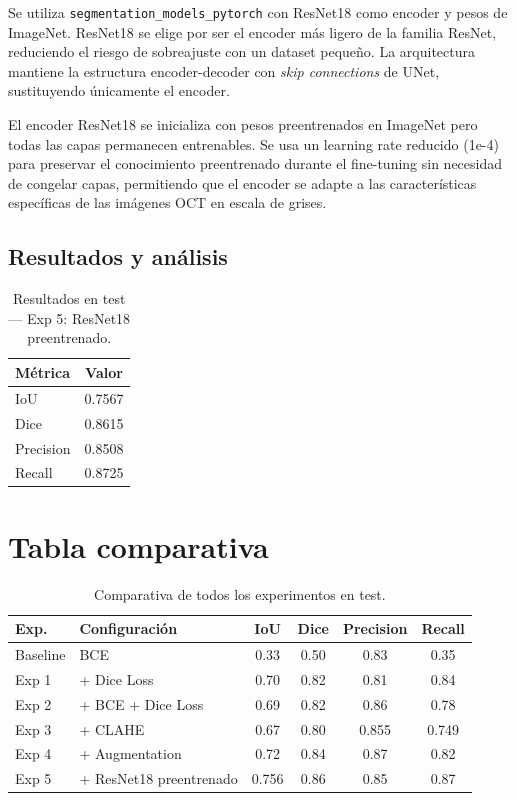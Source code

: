 \documentclass[12pt,a4paper]{article}
\begin{document}
Se utiliza \texttt{segmentation\_models\_pytorch} con ResNet18 como encoder y pesos de ImageNet. ResNet18 se elige por ser el encoder más ligero de la familia ResNet, reduciendo el riesgo de sobreajuste con un dataset pequeño. La arquitectura mantiene la estructura encoder-decoder con \textit{skip connections} de UNet, sustituyendo únicamente el encoder.

El encoder ResNet18 se inicializa con pesos preentrenados en ImageNet pero todas las capas permanecen entrenables. Se usa un learning rate reducido (1e-4) para preservar el conocimiento preentrenado durante el fine-tuning sin necesidad de congelar capas, permitiendo que el encoder se adapte a las características específicas de las imágenes OCT en escala de grises.

\subsection{Resultados y análisis}

\begin{table}[H]
\centering
\caption{Resultados en test — Exp 5: ResNet18 preentrenado.}
\label{tab:exp5}
\begin{tabular}{lc}
\toprule
Métrica & Valor \\
\midrule
IoU       &  0.7567\\
Dice      &  0.8615\\
Precision &  0.8508\\
Recall    &  0.8725\\
\bottomrule
\end{tabular}
\end{table}

\section{Tabla comparativa}

\begin{table}[H]
\centering
\caption{Comparativa de todos los experimentos en test.}
\label{tab:comparativa}
\begin{tabular}{llcccc}
\toprule
Exp. & Configuración & IoU & Dice & Precision & Recall \\
\midrule
Baseline & BCE                              & 0.33 & 0.50 & 0.83 & 0.35 \\
Exp 1    & + Dice Loss                      & 0.70 & 0.82 & 0.81 & 0.84 \\
Exp 2    & + BCE + Dice Loss                & 0.69 & 0.82 & 0.86 & 0.78 \\
Exp 3    & + CLAHE                          & 0.67 & 0.80 &  0.855    &  0.749    \\
Exp 4    & + Augmentation                   & 0.72 & 0.84 & 0.87 & 0.82 \\
Exp 5    & + ResNet18 preentrenado          &   0.756   &  0.86    &  0.85    &  0.87    \\
\bottomrule
\end{tabular}
\end{table}
\end{document}
